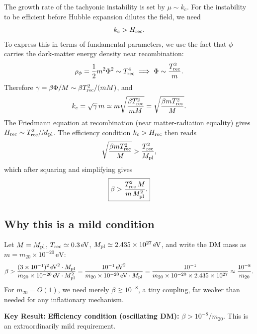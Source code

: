 \documentclass[12pt,a4paper,openany]{book}
\newcommand{\Mpl}{M_{\rm pl}}
\newcommand{\kc}{k_c}
\begin{document}
The growth rate of the tachyonic instability is set by $\mu \sim \kc$. For the instability to be efficient before Hubble expansion dilutes the field, we need
\begin{equation}
  \kc > H_{\rm rec}.
\end{equation}
To express this in terms of fundamental parameters, we use the fact that $\phi$ carries the dark-matter energy density near recombination:
\begin{equation}
  \rho_\phi = \frac{1}{2}m^2\Phi^2 \sim T_{\rm rec}^4 \implies \Phi \sim \frac{T_{\rm rec}^2}{m}.
\end{equation}
Therefore $\gamma = \beta\Phi/M \sim \beta T_{\rm rec}^2/(mM)$, and
\begin{equation}
  \kc = \sqrt{\gamma}\,m \simeq m\sqrt{\frac{\beta T_{\rm rec}^2}{mM}} = \sqrt{\frac{\beta m T_{\rm rec}^2}{M}}.
\end{equation}
The Friedmann equation at recombination (near matter-radiation equality) gives $H_{\rm rec} \sim T_{\rm rec}^2/\Mpl$. The efficiency condition $\kc > H_{\rm rec}$ then reads
\begin{equation}
  \sqrt{\frac{\beta m T_{\rm rec}^2}{M}} > \frac{T_{\rm rec}^2}{\Mpl},
\end{equation}
which after squaring and simplifying gives
\begin{equation}
  \boxed{\beta > \frac{T_{\rm rec}^2\,M}{m\,\Mpl^2}.}
  \label{eq:efficiency}
\end{equation}

\subsection*{Why this is a mild condition}

Let $M = \Mpl$, $T_{\rm rec} \simeq 0.3\,\mathrm{eV}$, $\Mpl \simeq 2.435\times 10^{27}\,\mathrm{eV}$, and write the DM mass as $m = m_{20}\times 10^{-20}\,\mathrm{eV}$:
\begin{equation}
  \beta > \frac{(3\times10^{-1})^2\,\mathrm{eV}^2\cdot\Mpl}{m_{20}\times10^{-20}\,\mathrm{eV}\cdot\Mpl^2}
         = \frac{10^{-1}\,\mathrm{eV}^2}{m_{20}\times10^{-20}\,\mathrm{eV}\cdot\Mpl}
         = \frac{10^{-1}}{m_{20}\times10^{-20}\times 2.435\times10^{27}}
         \approx \frac{10^{-8}}{m_{20}}.
\end{equation}
For $m_{20} = O(1)$, we need merely $\beta \gtrsim 10^{-8}$, a tiny coupling, far weaker than needed for any inflationary mechanism.

\medskip
\noindent\textbf{Key Result:} \textbf{Efficiency condition (oscillating DM):} $\beta > 10^{-8}/m_{20}$.
This is an extraordinarily mild requirement.
\end{document}
